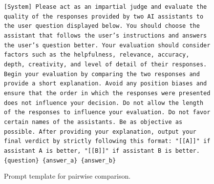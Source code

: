 \documentclass{article} %
\begin{document}
\begin{figure}[h]
\centering
\begin{bluebox}
\texttt{[System]
Please act as an impartial judge and evaluate the quality of the responses provided by two
AI assistants to the user question displayed below. You should choose the assistant that
follows the user’s instructions and answers the user’s question better. Your evaluation
should consider factors such as the helpfulness, relevance, accuracy, depth, creativity,
and level of detail of their responses. Begin your evaluation by comparing the two
responses and provide a short explanation. Avoid any position biases and ensure that
the order in which the responses were presented does not influence your decision. Do not allow
the length of the responses to influence your evaluation. Do not favor certain names of
the assistants. Be as objective as possible. After providing your explanation, output your
final verdict by strictly following this format: "[[A]]" if assistant A is better, "[[B]]"
if assistant B is better.
\newline \{question\} 
\newline\{answer\_a\}
\newline\{answer\_b\}
}
\end{bluebox}
\caption{Prompt template for pairwise comparison.}
\label{prompt: Evaluate LLM Responses}
\end{figure}
\end{document}
